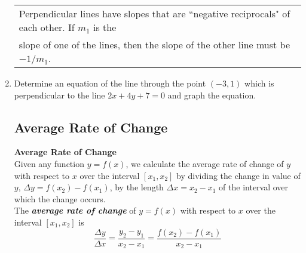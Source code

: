 \begin{enumerate}
\clearpage

\hspace{-.3in}\begin{tabular}{| l |  }
\hline Perpendicular lines have slopes that are ``negative reciprocals" of each other. If $m_1$ is the \\ slope of one of the lines, then the slope of the other line must be $-1/m_1$. \\ \hline
\end{tabular} 

\item Determine an equation of the line through the point $(-3, 1)$ which is perpendicular to the line $2x+4y+7=0$ and graph the equation.



\subsection{Average Rate of Change}
\textbf{Average Rate of Change}\\
Given any function $y=f(x)$, we calculate the average rate of change of $y$ with respect to $x$ over the interval  $[x_1,x_2]$ by dividing the change in value of $y$, $\Delta y=f(x_2)-f(x_1)$, by the length  $\Delta x=x_2-x_1$ of the interval over which the change occurs.\\


 The \textbf{\emph{average rate of change}} of $y=f(x)$ with respect to $x$ over the interval $[x_1,x_2]$ is
 $$\frac{\Delta y}{\Delta x}=\frac{y_2-y_1}{x_2-x_1}=\frac{f(x_2)-f(x_1)}{x_2-x_1}$$\\ 
 

\end{enumerate}

